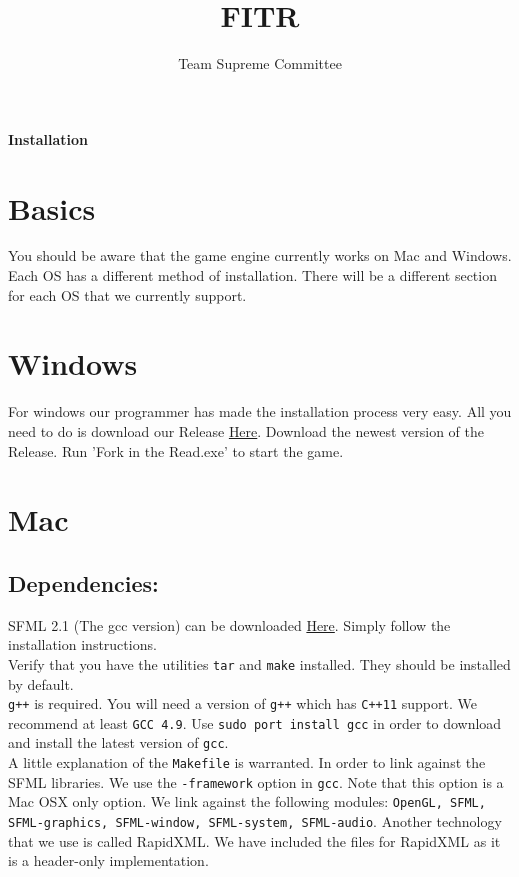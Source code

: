 \documentclass[11pt]{article}
\begin{document}
\title{FITR}
\lstset{language=XML}
\author{Team Supreme Committee}
\maketitle
\begin{center}\huge \bf Installation
\end{center}

\section{Basics}

\indent \indent You should be aware that the game engine currently works on Mac and Windows. Each OS has a different method of installation. There will be a different section for each OS that we currently support.

\section{Windows}

\indent \indent  For windows our programmer has made the installation process very easy. All you need to do is download our Release \href{https://github.com/supreme-committee/text-adventure/releases}{Here}. Download the newest version of the Release. Run 'Fork in the Read.exe' to start the game.

\section{Mac}
\subsection{Dependencies:}
    \indent \indent SFML 2.1 (The gcc version) can be downloaded
    \href{http://www.sfml-dev.org/download/sfml/2.1/}{Here}. Simply follow the installation instructions. \\
    \indent Verify that you have the utilities \texttt{tar} and \texttt{make} installed. 
    They should be installed by default. \\
    \indent \texttt{g++} is required. You will need a version of \texttt{g++} which has \texttt{C++11} support.
    We recommend at least \texttt{GCC 4.9}.
    Use \texttt{sudo port install gcc} in order to download and install the 
    latest version of \texttt{gcc}. \\
    \indent A little explanation of the \texttt{Makefile} is warranted. 
    In order to link against the SFML libraries.
    We use the \texttt{-framework} option in \texttt{gcc}. Note that this option is a Mac OSX only option.
    We link against the following modules: 
    \texttt{OpenGL, SFML, SFML-graphics, SFML-window, SFML-system, SFML-audio}.
    Another technology that we use is called RapidXML. We have included the files for RapidXML as it 
    is a header-only implementation.
    
\end{document}
